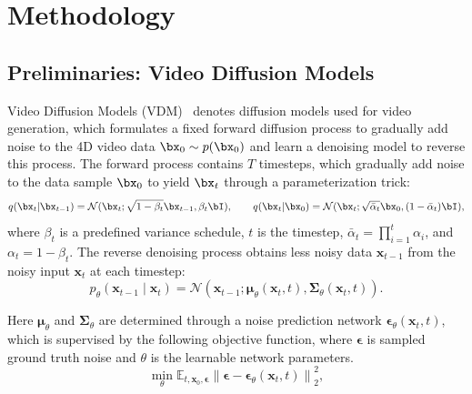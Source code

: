 \section{Methodology}
\label{methodology}

\subsection{Preliminaries: Video Diffusion Models}

Video Diffusion Models (VDM)~\citep{ho2022imagen} denotes diffusion models used for video generation, which formulates a fixed forward diffusion process to gradually add noise to the 4D video data $\bx_0 \sim p(\bx_0)$ and learn a denoising model to reverse this process. 
The forward process contains $T$ timesteps, which gradually add noise to the data sample $\bx_0$ to yield $\bx_t$ through a parameterization trick:
%
\begin{equation}
q(\bx_t|\bx_{t-1}) = \mathcal{N}(\bx_t;\sqrt{1-\beta_t}\bx_{t-1},\beta_t \bI), \qquad q(\bx_t|\bx_0) = \mathcal{N}(\bx_t; \sqrt{\bar\alpha_t}\bx_0, (1-\bar\alpha_t)\bI),
\end{equation}
%
where $\beta_t$ is a predefined variance schedule, $t$ is the timestep, $\bar\alpha_t = \prod_{i=1}^t \alpha_i$, and $\alpha_t = 1-\beta_t$.
The reverse denoising process obtains less noisy data $\boldsymbol{x}_{t-1}$ from the noisy input $\boldsymbol{x}_t$ at each timestep:
%
\begin{equation}
p_\theta\left(\boldsymbol{x}_{t-1} \mid \boldsymbol{x}_t\right)=\mathcal{N}\left(\boldsymbol{x}_{t-1} ; \boldsymbol{\mu}_\theta\left(\boldsymbol{x}_t, t\right), \boldsymbol{\Sigma}_\theta\left(\boldsymbol{x}_t, t\right)\right).
\end{equation}

Here $\boldsymbol{\mu}_\theta$ and $\boldsymbol{\Sigma}_\theta$ are determined through a noise prediction network $\boldsymbol{\epsilon}_{\theta}\left(\boldsymbol{x}_t, t\right)$, which is supervised by the following objective function, where $\boldsymbol{\epsilon}$ is sampled ground truth noise and $\theta$ is the learnable network parameters.
\begin{equation}
\min _{\theta} \mathbb{E}_{t, \boldsymbol{x}_0, \boldsymbol{\epsilon}}\left\|\boldsymbol{\epsilon}-\boldsymbol{\epsilon}_{\theta}\left(\boldsymbol{x}_t, t\right)\right\|_2^2,
\end{equation}

